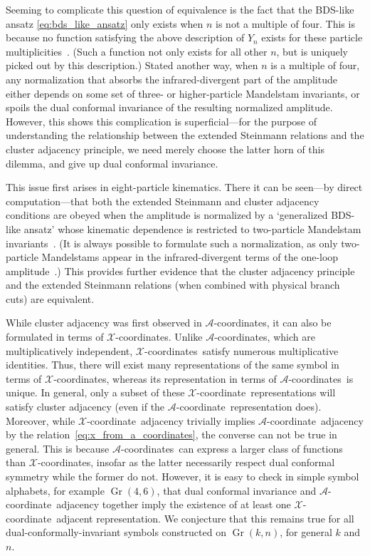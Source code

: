 \documentclass[12pt]{article}
\DeclareMathOperator{\Gr}{Gr}
\def\xcoord{$\mathcal{X}$-coordinate}
\def\xcoords{$\mathcal{X}$-coordinates}
\def\acoord{$\mathcal{A}$-coordinate}
\def\acoords{$\mathcal{A}$-coordinates}
\begin{document}
Seeming to complicate this question of equivalence is the fact that the BDS-like ansatz \eqref{eq:bds_like_ansatz} only exists when $n$ is not a multiple of four. This is because no function satisfying the above description of $Y_n$ exists for these particle multiplicities~\cite{Yang:2010az,Dixon:2016nkn}. (Such a function not only exists for all other $n$, but is uniquely picked out by this description.) Stated another way, when $n$ is a multiple of four, any normalization that absorbs the infrared-divergent part of the amplitude either depends on some set of three- or higher-particle Mandelstam invariants, or spoils the dual conformal invariance of the resulting normalized amplitude. However, this shows this complication is superficial---for the purpose of understanding the relationship between the extended Steinmann relations and the cluster adjacency principle, we need merely choose the latter horn of this dilemma, and give up dual conformal invariance. 

This issue first arises in eight-particle kinematics. There it can be seen---by direct computation---that both the extended Steinmann and cluster adjacency conditions are obeyed when the amplitude is normalized by a `generalized BDS-like ansatz' whose kinematic dependence is restricted to two-particle Mandelstam invariants~\cite{cluster_subalgebras_ii}. (It is always possible to formulate such a normalization, as only two-particle Mandelstams appear in the infrared-divergent terms of the one-loop amplitude~\cite{Bern:1994zx}.) This provides further evidence that the cluster adjacency principle and the extended Steinmann relations (when combined with physical branch cuts) are equivalent.

While cluster adjacency was first observed in \acoords, it can also be formulated in terms of \xcoords. Unlike \acoords, which are multiplicatively independent, \xcoords\ satisfy numerous multiplicative identities. Thus, there will exist many representations of the same symbol in terms of \xcoords, whereas its representation in terms of \acoords\ is unique. In general, only a subset of these \xcoord\ representations will satisfy cluster adjacency (even if the \acoord\ representation does). Moreover, while \xcoord\ adjacency trivially implies \acoord\ adjacency by the relation~\eqref{eq:x_from_a_coordinates}, the converse can not be true in general. This is because \acoords\ can express a larger class of functions than \xcoords, insofar as the latter necessarily respect dual conformal symmetry while the former do not. However, it is easy to check in simple symbol alphabets, for example $\Gr(4,6)$, that dual conformal invariance and \acoord\ adjacency together imply the existence of at least one \xcoord\ adjacent representation. We conjecture that this remains true for all dual-conformally-invariant symbols constructed on $\Gr(k,n)$, for general $k$ and $n$. 
\end{document}
